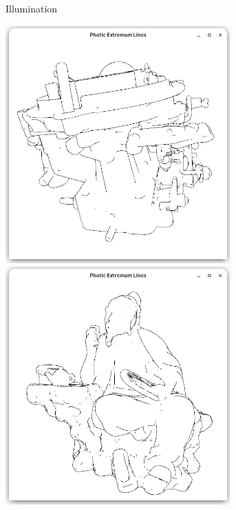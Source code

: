 \documentclass[9pt,fleqn,twoside,twocolumn]{stdglobal}
\begin{document}
\begin{figure}
\begin{subfigure}[t]{0.19\textwidth}
        \caption{Illumination}
      \end{subfigure}%
      \hfill%
      \begin{subfigure}[t]{0.19\textwidth}
        \centering
        \includegraphics[width=0.95\textwidth,trim={15px 15 15 50},clip]{images/results/carburetor-contours.png}
        \includegraphics[width=0.95\textwidth,trim={15px 15 15 50},clip]{images/results/luyu-contours.png}

\end{subfigure}
\end{figure}
\end{document}
